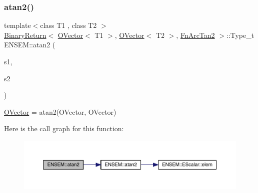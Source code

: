 \subsubsection{\texorpdfstring{atan2()}{atan2()}\hspace{0.1cm}{\footnotesize\ttfamily [1/3]}}
{\footnotesize\ttfamily template$<$class T1 , class T2 $>$ \\
\mbox{\hyperlink{structENSEM_1_1BinaryReturn}{Binary\+Return}}$<$ \mbox{\hyperlink{classENSEM_1_1OVector}{O\+Vector}}$<$ T1 $>$, \mbox{\hyperlink{classENSEM_1_1OVector}{O\+Vector}}$<$ T2 $>$, \mbox{\hyperlink{structENSEM_1_1FnArcTan2}{Fn\+Arc\+Tan2}} $>$\+::Type\+\_\+t E\+N\+S\+E\+M\+::atan2 (\begin{DoxyParamCaption}\item[{const \mbox{\hyperlink{classENSEM_1_1OVector}{O\+Vector}}$<$ T1 $>$ \&}]{s1,  }\item[{const \mbox{\hyperlink{classENSEM_1_1OVector}{O\+Vector}}$<$ T2 $>$ \&}]{s2 }\end{DoxyParamCaption})\hspace{0.3cm}{\ttfamily [inline]}}



\mbox{\hyperlink{classENSEM_1_1OVector}{O\+Vector}} = atan2(\+O\+Vector, O\+Vector) 

Here is the call graph for this function\+:\nopagebreak
\begin{figure}[H]
\begin{center}
\leavevmode
\includegraphics[width=350pt]{da/d59/group__obsvector_gae0d11c0b7d0fc49cc1e2765f21d10a2b_cgraph}
\end{center}
\end{figure}
\mbox{\label{group__obsvector_ga6f583b255bc8225ce768b9b916c9e271}} 
